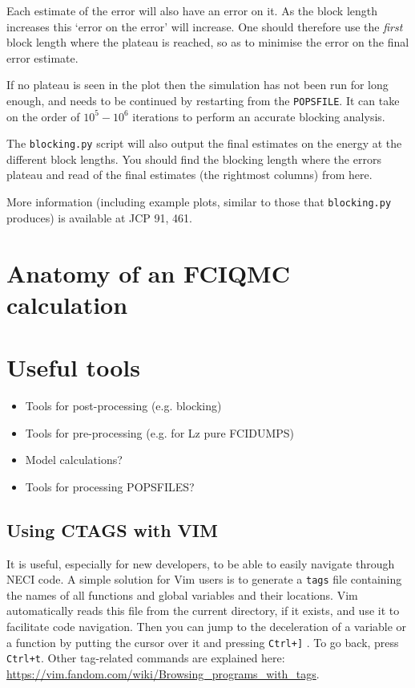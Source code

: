\documentclass[a4paper,notitlepage]{scrreprt}
\let\code\lstinline
\begin{document}
    Each estimate of the error will also have an error on it. As the block
    length increases this `error on the error' will increase. One should
    therefore use the \emph{first} block length where the plateau is reached,
    so as to minimise the error on the final error estimate.

    If no plateau is seen in the plot then the simulation has not been run for
	long enough, and needs to be continued by restarting from the \code{POPSFILE}.
    It can take on the order of $10^5-10^6$ iterations to perform an accurate
    blocking analysis.

	The \code{blocking.py} script will also output the final estimates on the energy
    at the different block lengths. You should find the blocking length where
    the errors plateau and read of the final estimates (the rightmost columns)
    from here.

	More information (including example plots, similar to those that
	\code{blocking.py} produces) is available at JCP 91, 461.

\section{Anatomy of an FCIQMC calculation}
\section{Useful tools}
\begin{itemize}
	\item Tools for post-processing (e.g. blocking)
	\item Tools for pre-processing (e.g. for Lz pure FCIDUMPS)
	\item Model calculations?
	\item Tools for processing POPSFILES?
\end{itemize}
\subsection{Using CTAGS with VIM}

It is useful, especially for new developers, to be able to easily navigate through NECI code.
A simple solution for Vim users is to generate a \code{tags} file containing the names of all functions and global variables and their locations.
Vim automatically reads this file from the current directory, if it exists, and use it to facilitate code navigation. Then you can jump to the deceleration of a variable or a function
by putting the cursor over it and pressing \code{Ctrl+]} . To go back, press \code{Ctrl+t}.
Other tag-related commands are explained here: \url{https://vim.fandom.com/wiki/Browsing_programs_with_tags}.
\end{document}
